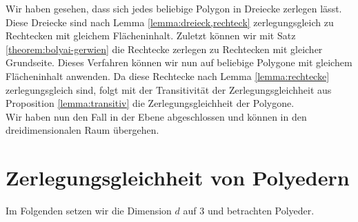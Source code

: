\documentclass[11pt,titlepage]{article}
\theoremstyle{definition}
\theoremstyle{remark}
\begin{document}
	Wir haben gesehen, dass sich jedes beliebige Polygon in Dreiecke zerlegen lässt. Diese Dreiecke 
	sind nach Lemma \ref{lemma:dreieck,rechteck} zerlegungsgleich zu Rechtecken mit gleichem 
	Flächeninhalt. Zuletzt können wir mit Satz \ref{theorem:bolyai-gerwien} die Rechtecke zerlegen zu Rechtecken 
	mit gleicher Grundseite. Dieses Verfahren können wir nun auf beliebige Polygone mit gleichem Flächeninhalt 
	anwenden. Da diese Rechtecke nach Lemma \ref{lemma:rechtecke} zerlegungsgleich sind, folgt mit der 
	Transitivität der Zerlegungsgleichheit aus Proposition \ref{lemma:transitiv} die Zerlegungsgleichheit der Polygone. \\
	Wir haben nun den Fall in der Ebene abgeschlossen und können in 
	den dreidimensionalen Raum übergehen. 
	
	\newpage
	
	\section{Zerlegungsgleichheit von Polyedern}
	
	Im Folgenden setzen wir die Dimension $d$ auf $3$ und betrachten Polyeder. 
	
\end{document}

